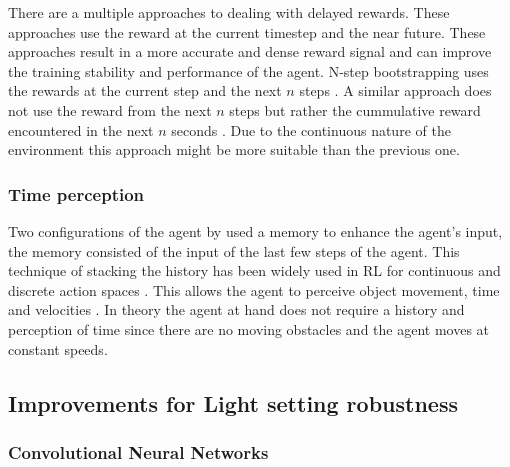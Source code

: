 There are a multiple approaches to dealing with delayed rewards. These approaches use the reward at the current timestep and the near future. These approaches result in a more accurate and dense reward signal and can improve the training stability and performance of the agent.
N-step bootstrapping uses the rewards at the current step and the next \(n\) steps \autocite{nstepbootstrapping}.  
A similar approach does not use the reward from the next \(n\) steps but rather the cummulative reward encountered in the next \(n\) seconds \autocite{trackmania}. Due to the continuous nature of the environment this approach might be more suitable than the previous one.


\subsubsection{Time perception}

Two configurations of the agent by \autocite{maximilian} used a memory to enhance the agent's input, the memory consisted of the input of the last few steps of the agent. This technique of stacking the history has been widely used in RL for continuous \autocite{atari} and discrete action spaces \autocite{alphago}. This allows the agent to perceive object movement, time and velocities \autocite{atari}.
In theory the agent at hand does not require a history and perception of time since there are no moving obstacles and the agent moves at constant speeds.



\subsection{Improvements for Light setting robustness} \label{light_setting_robustness}

\subsubsection{Convolutional Neural Networks}

